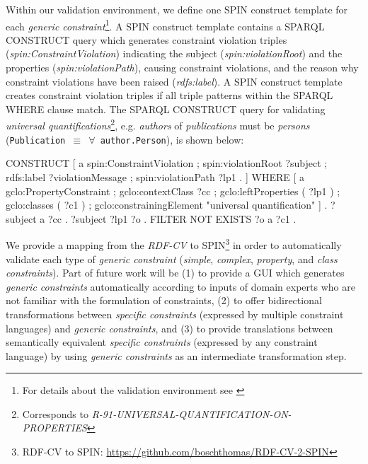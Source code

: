 \documentclass{llncs}
\newcommand{\ms}[1]{\texttt{#1}}
\begin{document}
{Within our validation environment, we define one SPIN construct template for each \emph{generic constraint}\footnote{For details about the validation environment see \cite{BoschEckert2014-2}}.
A SPIN construct template contains a SPARQL CONSTRUCT query which generates constraint violation triples (\emph{spin:ConstraintViolation}) indicating the subject (\emph{spin:violationRoot}) and the properties (\emph{spin:violationPath}), causing constraint violations, and the reason why constraint violations have been raised (\emph{rdfs:label}).
A SPIN construct template creates constraint violation triples if all triple patterns within the SPARQL WHERE clause match.
The SPARQL CONSTRUCT query for validating \emph{universal quantifications}\footnote{Corresponds to \emph{R-91-UNIVERSAL-QUANTIFICATION-ON-PROPERTIES}}, e.g. \emph{authors} of \emph{publications} must be \emph{persons} (\ms{Publication $\equiv$ $\forall$ author.Person}), is shown below:

\begin{ex}
CONSTRUCT {
    [   a spin:ConstraintViolation ; spin:violationRoot ?subject ;
        rdfs:label ?violationMessage ; spin:violationPath ?lp1 . ] }
WHERE {	  
    [   a gclo:PropertyConstraint ;
        gclo:contextClass ?cc ;
        gclo:leftProperties ( ?lp1 ) ;
        gclo:classes ( ?c1 ) ;
        gclo:constrainingElement "universal quantification" ] .
    ?subject a ?cc .
    ?subject ?lp1 ?o .
    FILTER NOT EXISTS { ?o a ?c1 } . }
\end{ex}

We provide a mapping from the \emph{RDF-CV} to SPIN\footnote{RDF-CV to SPIN: \url{https://github.com/boschthomas/RDF-CV-2-SPIN}} in order to automatically validate each type of \emph{generic constraint} (\emph{simple}, \emph{complex}, \emph{property}, and \emph{class constraints}).
Part of future work will be 
(1) to provide a GUI which generates \emph{generic constraints} automatically according to inputs of domain experts who are not familiar with the formulation of constraints,
(2) to offer bidirectional transformations between \emph{specific constraints} (expressed by multiple constraint languages) and \emph{generic constraints}, and
(3) to provide translations between semantically equivalent \emph{specific constraints} (expressed by any constraint language) by using \emph{generic constraints} as an intermediate transformation step.

}
\end{document}
